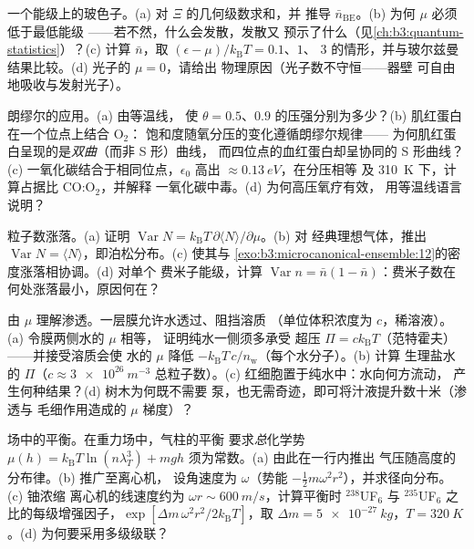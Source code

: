\begin{exercise}[$\star\star$]\label{exo:b3:grand-canonical:5}
一个能级上的玻色子。(a) 对 $\Xi$ 的几何级数求和，并
推导 $\bar n_{\text{BE}}$。(b) 为何 $\mu$ 必须低于最低能级
——若不然，什么会发散，发散又
预示了什么（见\cref{ch:b3:quantum-statistics}）？(c) 计算
$\bar n$，取 $(\epsilon - \mu)/k_{\text{B}}T = 0.1$、$1$、
$3$ 的情形，并与玻尔兹曼结果比较。(d) 光子的 $\mu = 0$，请给出
物理原因（光子数不守恒——器壁
可自由地吸收与发射光子）。
\end{exercise}

\begin{exercise}[$\star\star$]\label{exo:b3:grand-canonical:6}
朗缪尔的应用。(a) 由等温线，
使 $\theta = 0.5$、$0.9$ 的压强分别为多少？(b) 肌红蛋白在一个位点上结合 O$_2$：
饱和度随氧分压的变化遵循朗缪尔规律——
为何肌红蛋白呈现的是\emph{双曲}（而非 S 形）曲线，
而四位点的血红蛋白却呈协同的 S 形曲线？
(c) 一氧化碳结合于相同位点，$\epsilon_0$
高出 $\approx\qty{0.13}{eV}$，在分压相等
及 \qty{310}{K} 下，计算占据比 CO:O$_2$，并解释
一氧化碳中毒。(d) 为何高压氧疗有效，
用等温线语言说明？
\end{exercise}

\begin{exercise}[$\star\star$]\label{exo:b3:grand-canonical:7}
粒子数涨落。(a) 证明 $\operatorname{Var}N =
k_{\text{B}}T\,\partial\langle N\rangle/\partial\mu$。(b) 对
经典理想气体，推出 $\operatorname{Var}N = \langle
N\rangle$，即泊松分布。(c) 使其与
\cref{exo:b3:microcanonical-ensemble:12}的密度涨落相协调。(d) 对单个
费米子能级，计算 $\operatorname{Var}n = \bar n(1 - \bar
n)$：费米子数在何处涨落最小，原因何在？
\end{exercise}

\begin{exercise}[$\star\star$]\label{exo:b3:grand-canonical:8}
由 $\mu$ 理解渗透。一层膜允许水透过、阻挡溶质
（单位体积浓度为 $c$，稀溶液）。(a) 令膜两侧水的 $\mu$ 相等，
证明纯水一侧须多承受
超压 $\Pi = ck_{\text{B}}T$（范特霍夫）——并接受溶质会使
水的 $\mu$ 降低
$-k_{\text{B}}T\,c/n_{\text{w}}$（每个水分子）。(b) 计算
生理盐水的 $\Pi$（$c \approx \qty{3e26}{m^{-3}}$
总粒子数）。(c) 红细胞置于纯水中：水向何方流动，
产生何种结果？(d) 树木为何既不需要
泵，也无需奇迹，即可将汁液提升数十米（渗透与
毛细作用造成的 $\mu$ 梯度）？
\end{exercise}

\begin{exercise}[$\star\star$]\label{exo:b3:grand-canonical:9}
场中的平衡。在重力场中，气柱的平衡
要求\emph{总}化学势 $\mu(h) =
k_{\text{B}}T\ln(n\lambda_T^3) + mgh$ 须为常数。(a) 由此在一行内推出
气压随高度的分布律。(b) 推广至离心机，
设角速度为 $\omega$（势能
$-\tfrac12 m\omega^2r^2$），并求径向分布。(c) 铀浓缩
离心机的线速度约为 $\omega r \sim
\qty{600}{m/s}$，计算平衡时 $^{238}$UF$_6$
与 $^{235}$UF$_6$ 之比的每级增强因子，$\exp[\Delta m\,\omega^2
r^2/2k_{\text{B}}T]$，取 $\Delta m = \qty{5e-27}{kg}$，$T =
\qty{320}{K}$。(d) 为何要采用多级级联？
\end{exercise}

